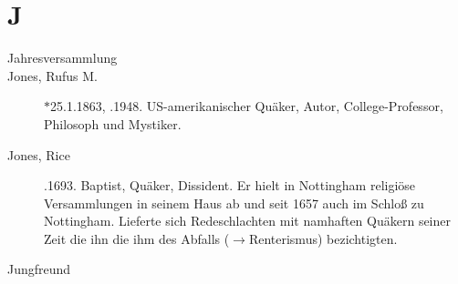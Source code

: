 \section*{J}

\articlesize

\begin{description}
 \item[Jahresversammlung]

 \item[Jones, Rufus M.] $\ast$25.1.1863, .1948. US-amerikanischer Quäker, Autor, College-Professor, Philosoph und Mystiker.

 \item[Jones, Rice] .1693. Baptist, Quäker, Dissident. Er hielt in Nottingham religiöse Versammlungen in seinem Haus ab und seit 1657 auch im Schloß zu Nottingham. Lieferte sich Redeschlachten mit namhaften Quäkern seiner Zeit die ihn die ihm des Abfalls ($\to$Renterismus) bezichtigten.

 \item[Jungfreund]
 \end{description}

\normalsize